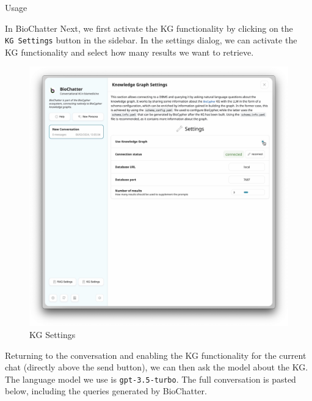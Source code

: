 Usage

In BioChatter Next, we first activate the KG functionality by clicking on the
\texttt{KG\ Settings} button in the sidebar. In the settings dialog, we can activate the
KG functionality and select how many results we want to retrieve.

\begin{fignos:no-prefix-figure-caption}

\begin{figure}
\centering
\includegraphics{images/kg-settings.png}
\caption{KG Settings}
\end{figure}

\end{fignos:no-prefix-figure-caption}

Returning to the conversation and enabling the KG functionality for the current
chat (directly above the send button), we can then ask the model about the KG.
The language model we use is \texttt{gpt-3.5-turbo}. The full conversation is pasted
below, including the queries generated by BioChatter.

